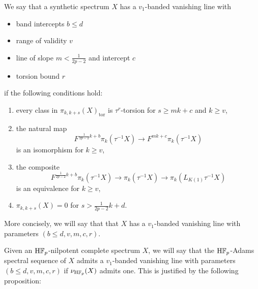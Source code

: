\begin{dfn}\label{dfn:banded-vanishing-line}
  We say that a synthetic spectrum $X$ has a $v_1$-banded vanishing line with
  \begin{itemize}
  \item band intercepts $b \leq d$
  \item range of validity $v$
  \item line of slope $m < \frac{1}{2p-2}$ and intercept $c$
  \item torsion bound $r$
  \end{itemize}
  if the following conditions hold:
  \begin{enumerate}
  \item every class in $\pi_{k,k+s} (X)_{\mathrm{tor}}$ is $\tau^{r}$-torsion for $s \geq mk+c$ and $k \geq v$,
  \item the natural map
    $$ F^{\frac{1}{2p-2} k + b} \pi_k (\tau^{-1} X) \to F^{mk + c} \pi_k (\tau^{-1} X) $$
    is an isomorphism for $k \geq v$,
  \item the composite
    $$ F^{\frac{1}{2p-2} k + b} \pi_{k} (\tau^{-1} X) \to \pi_k(\tau^{-1}X) \to \pi_k (L_{K(1)} \tau^{-1} X) $$
    is an equivalence for $k \geq v$,
  \item $\pi_{k,k+s} (X) = 0$ for $s > \frac{1}{2p-2} k + d$.
  \end{enumerate}
  
  More concisely, we will say that that $X$ has a $v_1$-banded vanishing line with parameters $(b \leq d, v, m, c, r)$.
\end{dfn}


\begin{rmk}
  Given an $\mathrm{H}\mathbb{F}_p$-nilpotent complete spectrum $X$, we will say that the $\mathrm{H}\mathbb{F}_p$-Adams spectral sequence of $X$ admits a $v_1$-banded vanishing line with parameters $(b \leq d, v, m, c, r)$ if $\nu_{\mathrm{H}\mathbb{F}_p} (X)$ admits one. This is justified by the following proposition:
\end{rmk}

